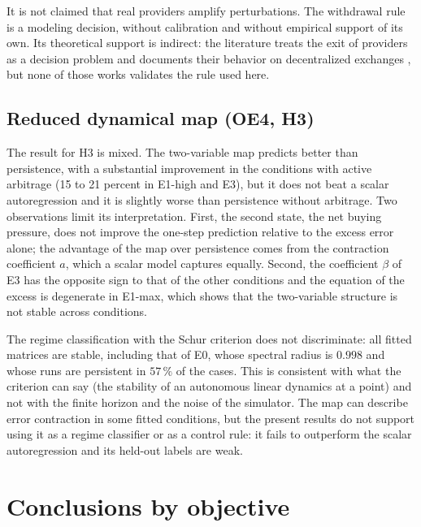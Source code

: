 It is not claimed that real providers amplify perturbations. The withdrawal rule is a modeling decision, without calibration and without empirical support of its own. Its theoretical support is indirect: the literature treats the exit of providers as a decision problem \cite{bergault2025exit} and documents their behavior on decentralized exchanges \cite{lehar2025uniswap}, but none of those works validates the rule used here.

\subsection{Reduced dynamical map (OE4, H3)}

The result for H3 is mixed. The two-variable map predicts better than persistence, with a substantial improvement in the conditions with active arbitrage (15 to 21 percent in E1-high and E3), but it does not beat a scalar autoregression and it is slightly worse than persistence without arbitrage. Two observations limit its interpretation. First, the second state, the net buying pressure, does not improve the one-step prediction relative to the excess error alone; the advantage of the map over persistence comes from the contraction coefficient $a$, which a scalar model captures equally. Second, the coefficient $\beta$ of E3 has the opposite sign to that of the other conditions and the equation of the excess is degenerate in E1-max, which shows that the two-variable structure is not stable across conditions.

The regime classification with the Schur criterion does not discriminate: all fitted matrices are stable, including that of E0, whose spectral radius is $0.998$ and whose runs are persistent in $57\,\%$ of the cases. This is consistent with what the criterion can say (the stability of an autonomous linear dynamics at a point) and not with the finite horizon and the noise of the simulator. The map can describe error contraction in some fitted conditions, but the present results do not support using it as a regime classifier or as a control rule: it fails to outperform the scalar autoregression and its held-out labels are weak.

\section{Conclusions by objective}


